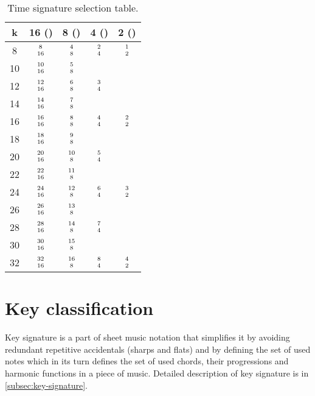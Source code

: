 \begin{table}[]
	\begin{center}
		\def\arraystretch{1.3}
		\begin{tabular}{|c||c|c|c|c|}
			\hline
			k & 16 (\Sech)   & 8 (\Acht)   & 4 (\Vier)   & 2 (\Halb)  \\ \hline
			8 & $8\atop16$   & $4\atop8$    & \cellcolor[HTML]{9AFF99}$2\atop4$   & $1\atop2$  \\ \hline
			10 & $10\atop16$  & \cellcolor[HTML]{9AFF99}$5\atop8$    & &            \\ \hline
			12 & $12\atop16$  & $6\atop8$    & \cellcolor[HTML]{9AFF99}$3\atop4$   &            \\ \hline
			14 & $14\atop16$  & \cellcolor[HTML]{9AFF99}$7\atop8$    & &            \\ \hline
			16 & $16\atop16$  & $8\atop8$    & \cellcolor[HTML]{9AFF99}$4\atop4$   & $2\atop2$  \\ \hline
			18 & $18\atop16$  & \cellcolor[HTML]{9AFF99}$9\atop8$    & &            \\ \hline
			20 & $20\atop16$  & $10\atop8$   & \cellcolor[HTML]{9AFF99}$5\atop4$   &            \\ \hline
			22 & $22\atop16$  & \cellcolor[HTML]{9AFF99}$11\atop8$   & &            \\ \hline
			24 & $24\atop16$  & $12\atop8$   & \cellcolor[HTML]{9AFF99}$6\atop4$   & $3\atop2$  \\ \hline
			26 & $26\atop16$  & \cellcolor[HTML]{9AFF99}$13\atop8$   & &            \\ \hline
			28 & $28\atop16$  & $14\atop8$   & \cellcolor[HTML]{9AFF99}$7\atop4$   &            \\ \hline
			30 & $30\atop16$  & \cellcolor[HTML]{9AFF99}$15\atop8$   & &            \\ \hline
			32 & $32\atop16$  & $16\atop8$   & $8\atop4$   & \cellcolor[HTML]{9AFF99}$4\atop2$  \\ \hline
		\end{tabular}
		\caption{Time signature selection table.}
		\label{fig:time-signatures-table}
	\end{center}
\end{table}


\section{Key classification}\label{sec:key-classification}
Key signature is a part of sheet music notation that simplifies it by avoiding redundant repetitive accidentals (sharps
and flats) and by defining the set of used notes which in its turn defines the set of used chords, their progressions
and harmonic functions in a piece of music. Detailed description of key signature is in \cref{subsec:key-signature}.

